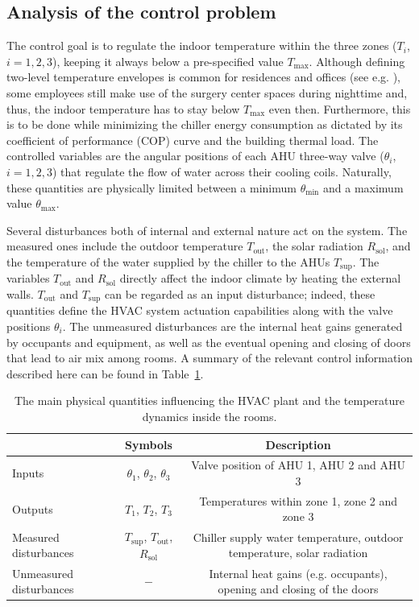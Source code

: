 \subsection{Analysis of the control problem}
\label{sec.controlProb}

The control goal is to regulate the indoor temperature within the three zones ($T_i$, $i=1,2,3$), keeping it always below a pre-specified value $T_{\text{max}}$. Although defining two-level temperature envelopes is common for residences and offices (see e.g. \cite{fiorentini2017hybrid,lian2021adaptive}), some employees still make use of the surgery center spaces during nighttime and, thus, the indoor temperature has to stay below $T_{\text{max}}$ even then. Furthermore, this is to be done while minimizing the chiller energy consumption as dictated by its coefficient of performance (COP) curve and the building thermal load. The controlled variables are the angular positions of each AHU three-way valve ($\theta_i$, $i=1,2,3$) that regulate the flow of water across their cooling coils. Naturally, these quantities are physically limited between a minimum $\theta_\text{min}$ and a maximum value $\theta_\text{max}$.

Several disturbances both of internal and external nature act on the system. The measured ones include the outdoor temperature $T_\text{out}$, the solar radiation $R_\text{sol}$, and the temperature of the water supplied by the chiller to the AHUs $T_\text{sup}$. The variables $T_\text{out}$ and $R_\text{sol}$ directly affect the indoor climate by heating the external walls. $T_\text{out}$ and $T_\text{sup}$ can be regarded as an input disturbance; indeed, these quantities define the HVAC system actuation capabilities along with the valve positions $\theta_i$. The unmeasured disturbances are the internal heat gains generated by occupants and equipment, as well as the eventual opening and closing of doors that lead to air mix among rooms. A summary of the relevant control information described here can be found in Table~\ref{tab.controlInformation}.

\begin{table}[!ht]
	\small
	\centering
	\begin{tabular}{l|c|c}
		\hline & Symbols & Description \\\hline
		Inputs & $\theta_\text{1}$, $\theta_\text{2}$, $\theta_\text{3}$ & Valve position of AHU 1, AHU 2 and AHU 3 \\
		Outputs & $T_\text{1}$, $T_\text{2}$, $T_\text{3}$ & Temperatures within zone 1, zone 2 and zone 3 \\
		Measured disturbances & $T_\text{sup}$, $T_\text{out}$, $R_\text{sol}$ & Chiller supply water temperature, outdoor temperature, solar radiation \\
		Unmeasured disturbances & $-$ & Internal heat gains (e.g. occupants), opening and closing of the doors \\
		\hline
	\end{tabular}
	\caption{The main physical quantities influencing the HVAC plant and the temperature dynamics inside the rooms.}
	\label{tab.controlInformation}
\end{table}

